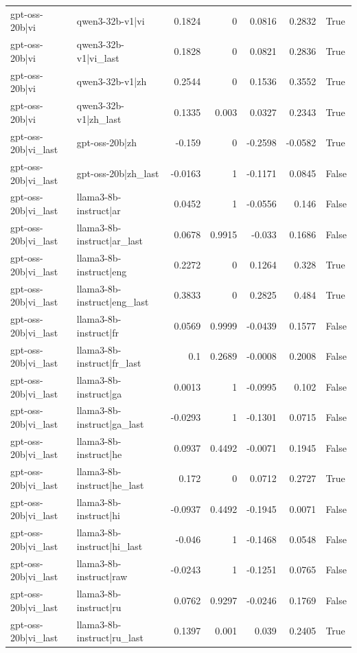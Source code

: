 \begin{table}
\begin{tabular}{l l r r r r l}
gpt-oss-20b|vi & qwen3-32b-v1|vi & 0.1824 & 0 & 0.0816 & 0.2832 & True \\
gpt-oss-20b|vi & qwen3-32b-v1|vi_last & 0.1828 & 0 & 0.0821 & 0.2836 & True \\
gpt-oss-20b|vi & qwen3-32b-v1|zh & 0.2544 & 0 & 0.1536 & 0.3552 & True \\
gpt-oss-20b|vi & qwen3-32b-v1|zh_last & 0.1335 & 0.003 & 0.0327 & 0.2343 & True \\
gpt-oss-20b|vi_last & gpt-oss-20b|zh & -0.159 & 0 & -0.2598 & -0.0582 & True \\
gpt-oss-20b|vi_last & gpt-oss-20b|zh_last & -0.0163 & 1 & -0.1171 & 0.0845 & False \\
gpt-oss-20b|vi_last & llama3-8b-instruct|ar & 0.0452 & 1 & -0.0556 & 0.146 & False \\
gpt-oss-20b|vi_last & llama3-8b-instruct|ar_last & 0.0678 & 0.9915 & -0.033 & 0.1686 & False \\
gpt-oss-20b|vi_last & llama3-8b-instruct|eng & 0.2272 & 0 & 0.1264 & 0.328 & True \\
gpt-oss-20b|vi_last & llama3-8b-instruct|eng_last & 0.3833 & 0 & 0.2825 & 0.484 & True \\
gpt-oss-20b|vi_last & llama3-8b-instruct|fr & 0.0569 & 0.9999 & -0.0439 & 0.1577 & False \\
gpt-oss-20b|vi_last & llama3-8b-instruct|fr_last & 0.1 & 0.2689 & -0.0008 & 0.2008 & False \\
gpt-oss-20b|vi_last & llama3-8b-instruct|ga & 0.0013 & 1 & -0.0995 & 0.102 & False \\
gpt-oss-20b|vi_last & llama3-8b-instruct|ga_last & -0.0293 & 1 & -0.1301 & 0.0715 & False \\
gpt-oss-20b|vi_last & llama3-8b-instruct|he & 0.0937 & 0.4492 & -0.0071 & 0.1945 & False \\
gpt-oss-20b|vi_last & llama3-8b-instruct|he_last & 0.172 & 0 & 0.0712 & 0.2727 & True \\
gpt-oss-20b|vi_last & llama3-8b-instruct|hi & -0.0937 & 0.4492 & -0.1945 & 0.0071 & False \\
gpt-oss-20b|vi_last & llama3-8b-instruct|hi_last & -0.046 & 1 & -0.1468 & 0.0548 & False \\
gpt-oss-20b|vi_last & llama3-8b-instruct|raw & -0.0243 & 1 & -0.1251 & 0.0765 & False \\
gpt-oss-20b|vi_last & llama3-8b-instruct|ru & 0.0762 & 0.9297 & -0.0246 & 0.1769 & False \\
gpt-oss-20b|vi_last & llama3-8b-instruct|ru_last & 0.1397 & 0.001 & 0.039 & 0.2405 & True \\

\end{tabular}
\end{table}
